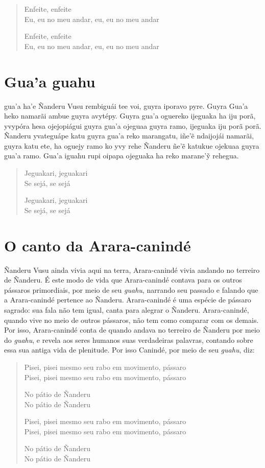 \begin{verse}
Enfeite, enfeite\\
Eu, eu no meu andar, eu, eu no meu andar

Enfeite, enfeite\\
Eu, eu no meu andar, eu, eu no meu andar
\end{verse}

\chapter{Gua'a guahu}

 gua'a ha'e Ñanderu Vusu rembiguái tee voi, guyra iporavo pyre.
Guyra Gua'a heko namarãi ambue guyra avytépy. Guyra gua'a oguereko
ijeguaka ha iju porã, yvypóra hesa ojejopiágui guyra gua'a ojeguaa guyra
ramo, ijeguaka iju porã porã. Ñanderu yvateguápe katu guyra gua'a reko
marangatu, iñe'ẽ ndaijojái namarãi, guyra katu ete, ha oguejy ramo ko
yvy rehe Ñanderu ñe'ẽ katukue ojekuaa guyra gua'a ramo. Gua'a iguahu
rupi oipapa ojeguaka ha reko marane'ỹ rehegua.

\begin{verse}
Jeguakari, jeguakari\\
Se sejá, se sejá

Jeguakari, jeguakari\\
Se sejá, se sejá
\end{verse}

\chapter{O canto da Arara-canindé}

 Ñanderu Vusu ainda vivia aqui na terra, Arara-canindé vivia
andando no terreiro de Ñanderu. É este modo de vida que Arara-canindé
contava para os outros pássaros primordiais, por meio de seu
\textit{guahu}, narrando seu passado e falando que a Arara-canindé
pertence ao Ñanderu. Arara-canindé é uma espécie de pássaro sagrado: sua
fala não tem igual, canta para alegrar o Ñanderu. Arara-canindé, quando
vive no meio de outros pássaros, não tem como comparar com os demais.
Por isso, Arara-canindé conta de quando andava no terreiro de Ñanderu
por meio do \textit{guahu}, e revela aos seres humanos suas verdadeiras
palavras, contando sobre essa sua antiga vida de plenitude. Por isso
Canindé, por meio de seu \textit{guahu}, diz:

\begin{verse}
Pisei, pisei mesmo seu rabo em movimento, pássaro\\
Pisei, pisei mesmo seu rabo em movimento, pássaro

No pátio de Ñanderu\\
No pátio de Ñanderu

Pisei, pisei mesmo seu rabo em movimento, pássaro\\
Pisei, pisei mesmo seu rabo em movimento, pássaro

No pátio de Ñanderu\\
No pátio de Ñanderu
\end{verse}

